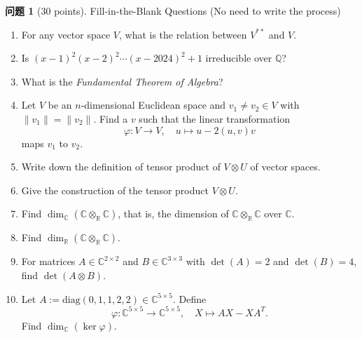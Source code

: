 \documentclass{MainStyle}
\theoremstyle{definition}
\newtheorem{problem}{问题}
\begin{document}
\large
\maketitle

\begin{problem}[30 points]
Fill-in-the-Blank Questions (No need to write the process)
\begin{enumerate}
    \item For any vector space $V$, what is the relation between $V^{\ast\ast}$ and $V$.
    \item Is $(x-1)^2(x-2)^2\cdots (x-2024)^2+1$ irreducible over $\mathbb Q$?
    \item What is the \emph{Fundamental Theorem of Algebra}?
    \item Let $V$ be an $n$-dimensional Euclidean space and $v_1\neq v_2\in V$ with $\|v_1\|=\|v_2\|$. Find a $v$ such that the linear transformation
          \begin{equation*}
              \varphi :V\to V,\quad u\mapsto u-2(u,v)v
          \end{equation*}
          maps $v_1$ to $v_2$.
    \item Write down the definition of tensor product of $V\otimes U$ of vector spaces.
    \item Give the construction of the tensor product $V\otimes U$.
    \item Find $\dim_{\mathbb C}(\mathbb C\otimes_{\mathbb R} \mathbb C)$, that is, the dimension of $\mathbb C\otimes _{\mathbb R}\mathbb C$ over $\mathbb C$.
    \item Find $\dim _{\mathbb R}(\mathbb C\otimes _{\mathbb R}\mathbb C)$.
    \item For matrices $A\in \mathbb C^{2\times 2}$ and $B\in \mathbb C^{3\times 3}$ with $\det (A)=2$ and $\det (B)=4$, find $\det (A\otimes B)$.
    \item Let $A:=\mathrm{diag}(0,1,1,2,2)\in \mathbb C^{5\times 5}$. Define
          \begin{equation*}
              \varphi:\mathbb C^{5\times 5}\to \mathbb C^{5\times 5},\quad X\mapsto AX-XA^T.
          \end{equation*}
          Find $\dim _{\mathbb C}(\ker \varphi)$.
\end{enumerate}
\end{problem}
\end{document}

